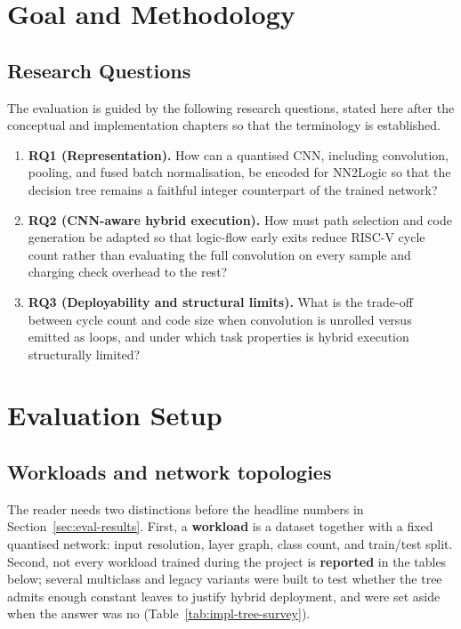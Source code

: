 \section{Goal and Methodology}

\subsection{Research Questions}
\label{sec:research-questions}

The evaluation is guided by the following research questions, stated here after the conceptual and implementation chapters so that the terminology is established.

\begin{enumerate}
	\item \textbf{RQ1 (Representation).}
	\label{rq:representation}
	How can a quantised \ac{CNN}, including convolution, pooling, and fused batch normalisation, be encoded for NN2Logic so that the decision tree remains a faithful integer counterpart of the trained network?

	\item \textbf{RQ2 (CNN-aware hybrid execution).}
	\label{rq:hybrid}
	How must path selection and code generation be adapted so that logic-flow early exits reduce \mbox{RISC-V} cycle count rather than evaluating the full convolution on every sample and charging check overhead to the rest?

	\item \textbf{RQ3 (Deployability and structural limits).}
	\label{rq:limits}
	What is the trade-off between cycle count and code size when convolution is unrolled versus emitted as loops, and under which task properties is hybrid execution structurally limited?
\end{enumerate}

\section{Evaluation Setup}

\subsection{Workloads and network topologies}
\label{sec:eval-workloads}

The reader needs two distinctions before the headline numbers in Section~\ref{sec:eval-results}.
First, a \textbf{workload} is a dataset together with a fixed quantised network: input resolution, layer graph, class count, and train/test split.
Second, not every workload trained during the project is \textbf{reported} in the tables below; several multiclass and legacy variants were built to test whether the tree admits enough constant leaves to justify hybrid deployment, and were set aside when the answer was no (Table~\ref{tab:impl-tree-survey}).

